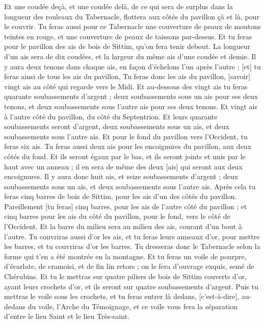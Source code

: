 \begin{multicols}{2}
Et une coudée deçà, et une coudée delà, de ce qui sera de surplus dans la longueur des rouleaux du Tabernacle, flottera aux côtés du pavillon çà et là, pour le couvrir.
Tu feras aussi pour ce Tabernacle une couverture de peaux de moutons teintes en rouge, et une couverture de peaux de taissons par-dessus.
Et tu feras pour le pavillon des ais de bois de Sittim, qu'on fera tenir debout.
La longueur d'un ais sera de dix coudées, et la largeur du même ais d'une coudée et demie.
Il y aura deux tenons dans chaque ais, en façon d'échelons l'un après l'autre ; [et] tu feras ainsi de tous les ais du pavillon,
Tu feras donc les ais du pavillon, [savoir] vingt ais au côté qui regarde vers le Midi.
Et au-dessous des vingt ais tu feras quarante soubassements d'argent ; deux soubassements sous un ais pour ses deux tenons, et deux soubassements sous l'autre ais pour ses deux tenons.
Et vingt ais à l'autre côté du pavillon, du côté du Septentrion.
Et leurs quarante soubassements seront d'argent, deux soubassements sous un ais, et deux soubassements sous l'autre ais.
Et pour le fond du pavillon vers l'Occident, tu feras six ais.
Tu feras aussi deux ais pour les encoignures du pavillon, aux deux côtés du fond.
Et ils seront égaux par le bas, et ils seront joints et unis par le haut avec un anneau ; il en sera de même des deux [ais] qui seront aux deux encoignures.
Il y aura donc huit ais, et seize soubassements d'argent ; deux soubassements sous un ais, et deux soubassements sous l'autre ais.
Après cela tu feras cinq barres de bois de Sittim, pour les ais d'un des côtés du pavillon.
Pareillement [tu feras] cinq barres, pour les ais de l'autre côté du pavillon ; et cinq barres pour les ais du côté du pavillon, pour le fond, vers le côté de l'Occident.
Et la barre du milieu sera au milieu des ais, courant d'un bout à l'autre.
Tu couvriras aussi d'or les ais, et tu feras leurs anneaux d'or, pour mettre les barres, et tu couvriras d'or les barres.
Tu dresseras donc le Tabernacle selon la forme qui t'en a été montrée en la montagne.
Et tu feras un voile de pourpre, d'écarlate, de cramoisi, et de fin lin retors ; on le fera d'ouvrage exquis, semé de Chérubins.
Et tu le mettras sur quatre piliers de bois de Sittim couverts d'or, ayant leurs crochets d'or, et ils seront sur quatre soubassements d'argent.
Puis tu mettras le voile sous les crochets, et tu feras entrer là dedans, [c'est-à-dire], au-dedans du voile, l'Arche du Témoignage, et ce voile vous fera la séparation d'entre le lieu Saint et le lieu Très-saint.

\end{multicols}
